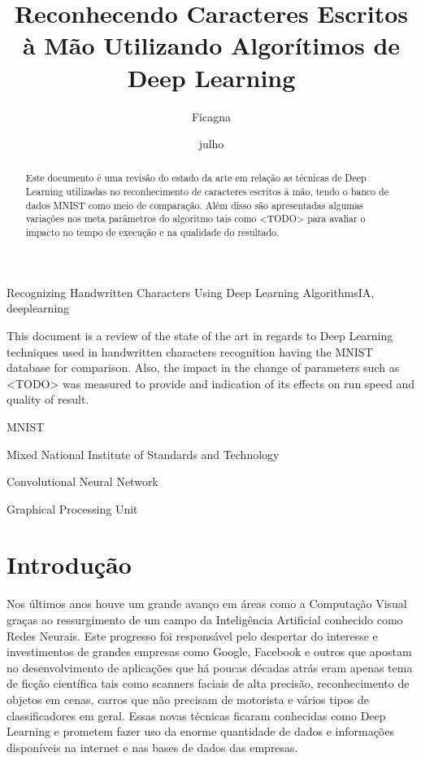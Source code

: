 \documentclass[cic,tc]{iiufrgs}
\title{Reconhecendo Caracteres Escritos à Mão Utilizando Algorítimos de Deep Learning}
\author{Ficagna}{Alan}
\date{julho}{2015}
\begin{document}
\maketitle

\begin{abstract}

  Este documento é uma revisão do estado da arte em relação as técnicas de
Deep Learning utilizadas no reconhecimento de caracteres escritos à mão, tendo o
banco de dados MNIST como meio de comparação. Além disso são apresentadas
algumas variações nos meta parâmetros do algoritmo tais como <TODO> para
avaliar o impacto no tempo de execução e na qualidade do resultado.

\end{abstract}

\begin{englishabstract}{Recognizing Handwritten Characters Using Deep Learning Algorithms}{IA, deeplearning} %

  This document is a review of the state of the art in regards to Deep Learning
techniques used in handwritten characters recognition having the MNIST
database for comparison. Also, the impact in the change of parameters such as
<TODO> was measured to provide and indication of its effects on run speed and
quality of result.

\end{englishabstract}

\listoffigures
\listoftables
\begin{listofabbrv}{MNIST} %
 \item[MNIST] Mixed National Institute of Standards and Technology
 \item[CNN] Convolutional Neural Network
 \item[GPU] Graphical Processing Unit
\end{listofabbrv}
\tableofcontents

\chapter{Introdução}

Nos últimos anos houve um grande avanço em áreas como a Computação
Visual graças ao ressurgimento de um campo da Inteligência Artificial conhecido
como Redes Neurais. Este progresso foi responsável pelo despertar do interesse
e investimentos de grandes empresas como Google, Facebook e outros que apostam
no desenvolvimento de aplicações que há poucas décadas atrás eram apenas tema
de ficção científica tais como scanners faciais de alta precisão,
reconhecimento de objetos em cenas, carros que não precisam de motorista e
vários tipos de classificadores em geral. Essas novas técnicas ficaram
conhecidas como Deep Learning e prometem fazer uso da enorme quantidade de
dados e informações disponíveis na internet e nas bases de dados das empresas.
\end{document}

